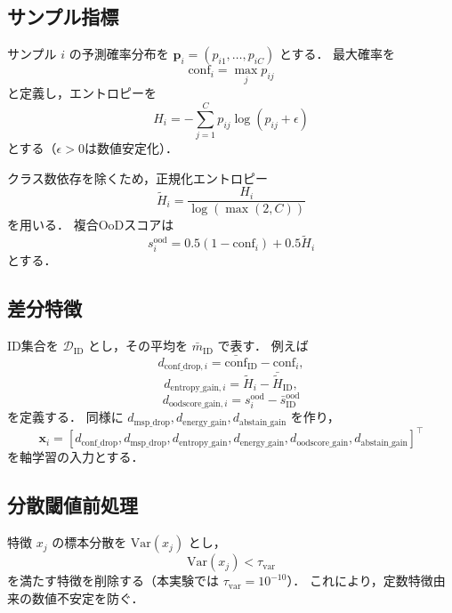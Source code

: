 \documentclass[11pt,a4paper]{article}
\begin{document}
\subsection*{サンプル指標}
サンプル $i$ の予測確率分布を $\mathbf{p}_i=(p_{i1},\ldots,p_{iC})$ とする．
最大確率を
\begin{equation}
\mathrm{conf}_i = \max_j p_{ij}
\end{equation}
と定義し，エントロピーを
\begin{equation}
H_i = -\sum_{j=1}^{C} p_{ij}\log(p_{ij}+\epsilon)
\end{equation}
とする（$\epsilon>0$は数値安定化）．

クラス数依存を除くため，正規化エントロピー
\begin{equation}
\tilde{H}_i = \frac{H_i}{\log(\max(2,C))}
\end{equation}
を用いる．
複合OoDスコアは
\begin{equation}
s_i^{\mathrm{ood}} = 0.5(1-\mathrm{conf}_i)+0.5\tilde{H}_i
\end{equation}
とする．

\subsection*{差分特徴}
ID集合を $\mathcal{D}_{\mathrm{ID}}$ とし，その平均を
$\bar{m}_{\mathrm{ID}}$ で表す．
例えば
\begin{equation}
d_{\mathrm{conf\_drop},i}=\bar{\mathrm{conf}}_{\mathrm{ID}}-\mathrm{conf}_i,
\end{equation}
\begin{equation}
d_{\mathrm{entropy\_gain},i}=\tilde{H}_i-\bar{\tilde{H}}_{\mathrm{ID}},
\end{equation}
\begin{equation}
d_{\mathrm{oodscore\_gain},i}=s_i^{\mathrm{ood}}-\bar{s}^{\mathrm{ood}}_{\mathrm{ID}}
\end{equation}
を定義する．
同様に $d_{\mathrm{msp\_drop}}, d_{\mathrm{energy\_gain}}, d_{\mathrm{abstain\_gain}}$ を作り，
\begin{equation}
\mathbf{x}_i=[d_{\mathrm{conf\_drop}}, d_{\mathrm{msp\_drop}}, d_{\mathrm{entropy\_gain}}, d_{\mathrm{energy\_gain}}, d_{\mathrm{oodscore\_gain}}, d_{\mathrm{abstain\_gain}}]^\top
\end{equation}
を軸学習の入力とする．

\subsection*{分散閾値前処理}
特徴 $x_j$ の標本分散を $\mathrm{Var}(x_j)$ とし，
\begin{equation}
\mathrm{Var}(x_j) < \tau_{\mathrm{var}}
\end{equation}
を満たす特徴を削除する（本実験では $\tau_{\mathrm{var}}=10^{-10}$）．
これにより，定数特徴由来の数値不安定を防ぐ．
\end{document}
